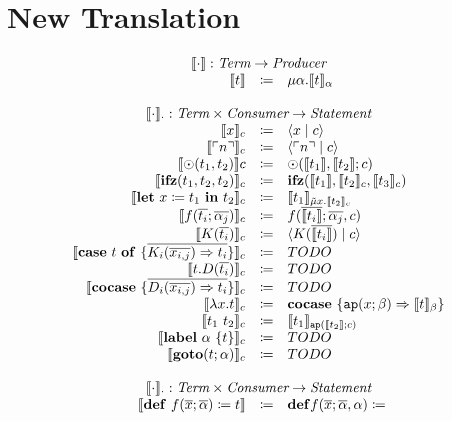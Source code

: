 \documentclass[nonacm]{acmart}
\newcommand{\translate}[1]{\ensuremath{\llbracket#1 \rrbracket}}
\newcommand{\lit}[1]{\ensuremath{\ulcorner #1\urcorner}}
\newcommand{\cut}[2]{\ensuremath{\langle #1 \mid #2 \rangle}}
\newcommand{\letin}[3]{\ensuremath{\mathbf{let}\ #1 \coloneqq #2\ \mathbf{in}\ #3}}
\newcommand{\caseof}[2]{\ensuremath{\mathbf{case}\ #1\ \mathbf{of}\ \{ #2 \}}}
\begin{document}
\section{New Translation}
\label{sec:new-translation}

\[
  \begin{array}{rcl}
    \multicolumn{3}{c}{\translate{\cdot} : \emph{Term} \rightarrow  \emph{Producer}}\\
    \translate{t} & \coloneqq & \mu \alpha. \translate{t}_{\alpha}\\
    \\
    \multicolumn{3}{c}{\translate{\cdot}_{\cdot} : \emph{Term}\times \emph{Consumer} \rightarrow \emph{Statement}}\\
    \translate{x}_{c} & \coloneq & \cut{x}{c} \\
    \translate{\lit{n}}_{c} & \coloneq & \cut{\lit{n}}{c} \\
    \translate{\odot(t_1,t_2)}{c} & \coloneq & \odot(\translate{t_1},\translate{t_2};c)\\
    \translate{\mathbf{ifz}(t_1,t_2,t_2)}_{c} & \coloneq & \mathbf{ifz}(\translate{t_1},\translate{t_2}_{c},\translate{t_3}_{c})\\
    \translate{\letin{x}{t_1}{t_2}}_{c} & \coloneq & \translate{t_1}_{\tilde{\mu}x.\translate{t_2}_c}\\
    \translate{f(\overline{t_i};\overline{\alpha_j})}_{c} & \coloneq & f(\overline{\translate{t_i}};\overline{\alpha_j},c)\\
    \translate{K(\overline{t_i})}_{c} & \coloneq & \cut{K(\overline{\translate{t_i}})}{c} \\
    \translate{\caseof{t}{\overline{K_i(\overline{x_{i,j}})\Rightarrow t_i}}}_{c} & \coloneq & TODO\\
    \translate{t.D(\overline{t_i})}_{c} & \coloneq & TODO\\
    \translate{\mathbf{cocase}\ \{\overline{D_i(\overline{x_{i,j}}) \Rightarrow t_i}\}}_{c} & \coloneq & TODO\\
    \translate{\lambda x.t}_{c} & \coloneq & \mathbf{cocase}\ \{ \mathtt{ap}(x;\beta) \Rightarrow \translate{t}_{\beta} \} \\
    \translate{t_1\ t_2}_{c} & \coloneq & \translate{t_1}_{\mathtt{ap}(\translate{t_2};c)}\\
    \translate{\mathbf{label}\ \alpha\ \{t\}}_{c} & \coloneq & TODO\\
    \translate{\mathbf{goto}(t;\alpha)}_{c} & \coloneq & TODO \\
    \\
    \multicolumn{3}{c}{\translate{\cdot}_{\cdot} : \emph{Term}\times \emph{Consumer} \rightarrow \emph{Statement}}\\
    \translate{\mathbf{def}\ f(\overline{x};\overline{\alpha}) \coloneq t} & \coloneq & \mathbf{def}f(\overline{x};\overline{\alpha},\alpha) \coloneq 
  \end{array}
\]
\end{document}

